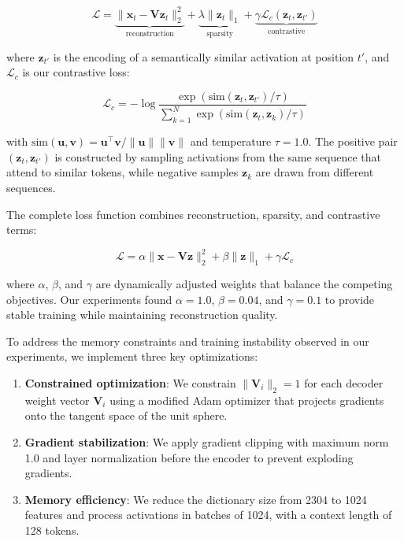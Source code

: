 \documentclass{article} %
\begin{document}
\begin{equation}
    \mathcal{L} = \underbrace{\|\mathbf{x}_t - \mathbf{V}\mathbf{z}_t\|_2^2}_{\text{reconstruction}} + \underbrace{\lambda\|\mathbf{z}_t\|_1}_{\text{sparsity}} + \underbrace{\gamma\mathcal{L}_c(\mathbf{z}_t, \mathbf{z}_{t'})}_{\text{contrastive}}
\end{equation}

where $\mathbf{z}_{t'}$ is the encoding of a semantically similar activation at position $t'$, and $\mathcal{L}_c$ is our contrastive loss:

\begin{equation}
    \mathcal{L}_c = -\log\frac{\exp(\text{sim}(\mathbf{z}_t,\mathbf{z}_{t'})/\tau)}{\sum_{k=1}^N \exp(\text{sim}(\mathbf{z}_t,\mathbf{z}_k)/\tau)}
\end{equation}

with $\text{sim}(\mathbf{u},\mathbf{v}) = \mathbf{u}^\top\mathbf{v}/\|\mathbf{u}\|\|\mathbf{v}\|$ and temperature $\tau=1.0$. The positive pair $(\mathbf{z}_t, \mathbf{z}_{t'})$ is constructed by sampling activations from the same sequence that attend to similar tokens, while negative samples $\mathbf{z}_k$ are drawn from different sequences.

The complete loss function combines reconstruction, sparsity, and contrastive terms:

\begin{equation}
    \mathcal{L} = \alpha\|\mathbf{x} - \mathbf{V}\mathbf{z}\|_2^2 + \beta\|\mathbf{z}\|_1 + \gamma\mathcal{L}_c
\end{equation}

where $\alpha$, $\beta$, and $\gamma$ are dynamically adjusted weights that balance the competing objectives. Our experiments found $\alpha=1.0$, $\beta=0.04$, and $\gamma=0.1$ to provide stable training while maintaining reconstruction quality.

To address the memory constraints and training instability observed in our experiments, we implement three key optimizations:

\begin{enumerate}
    \item \textbf{Constrained optimization}: We constrain $\|\mathbf{V}_i\|_2 = 1$ for each decoder weight vector $\mathbf{V}_i$ using a modified Adam optimizer \cite{kingma2014adam} that projects gradients onto the tangent space of the unit sphere.
    
    \item \textbf{Gradient stabilization}: We apply gradient clipping with maximum norm 1.0 and layer normalization before the encoder to prevent exploding gradients.
    
    \item \textbf{Memory efficiency}: We reduce the dictionary size from 2304 to 1024 features and process activations in batches of 1024, with a context length of 128 tokens.
\end{enumerate}
\end{document}
